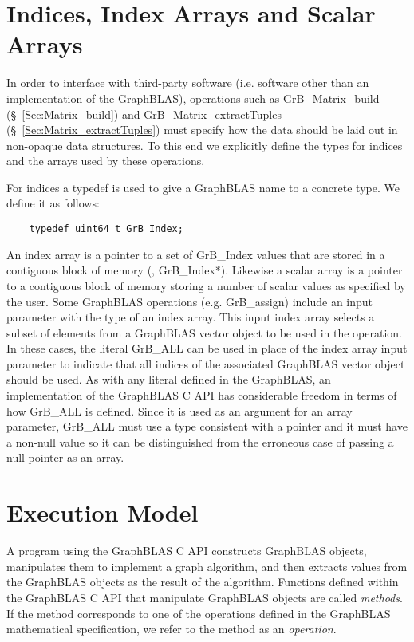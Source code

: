 \section{Indices, Index Arrays and Scalar Arrays}

In order to interface with third-party software (i.e. software other than
an implementation of the GraphBLAS), operations 
such as {\sf GrB\_Matrix\_build} (\S~\ref{Sec:Matrix_build}) and
{\sf GrB\_Matrix\_extractTuples} (\S~\ref{Sec:Matrix_extractTuples}) must specify
how the data should be laid out in  non-opaque data structures.  To 
this end we explicitly define the types for indices and the arrays 
used by these operations.

For indices a typedef is used to give a GraphBLAS name to a concrete type. We define it as follows:

\begin{verbatim}
    typedef uint64_t GrB_Index;
\end{verbatim}

An index array is a pointer to a set of {\sf GrB\_Index} values that are 
stored in a contiguous block of memory (\ie, {\sf GrB\_Index*}).
Likewise a scalar array is a pointer to a contiguous block of memory 
storing a number of scalar values as specified by the user.
Some GraphBLAS operations (e.g. {\sf GrB\_assign})  include an input parameter with the type of an index array. 
This input index array selects a subset of elements from a GraphBLAS vector object to be used in the operation.
In these cases, the literal {\sf GrB\_ALL} 
can be used in place of the index array input parameter to indicate that all indices 
of the associated GraphBLAS vector object should be used.
As with any literal defined in the GraphBLAS, an implementation of the GraphBLAS C API has considerable 
freedom in terms of how {\sf GrB\_ALL} is defined.  Since it is used as an argument for an array 
parameter, {\sf GrB\_ALL} must use a type consistent with a pointer and it must have a non-null
value so it can be distinguished from the erroneous case of passing a null-pointer as an array.

\section{Execution Model}
\label{Sec:ExecutionModel}

A program using the GraphBLAS C API constructs GraphBLAS objects,
manipulates them to implement a graph algorithm, and then extracts
values from the GraphBLAS objects as the result of the algorithm.
Functions defined within the GraphBLAS C API that manipulate GraphBLAS
objects are called \emph{methods}.  If the method corresponds to one
of the operations defined in the GraphBLAS mathematical specification,
we refer to the method as an \emph{operation}.

